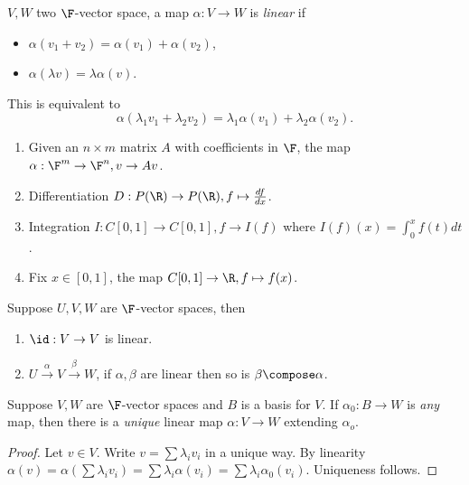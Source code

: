 \documentclass[a4paper]{article}
\theoremstyle{definition}
\begin{document}
\begin{defi}
  \(V, W\) two \(\F\)-vector space, a map \(\alpha: V\to W\) is \emph{linear} if
  \begin{itemize}
  \item \(\alpha(v_1 + v_2) = \alpha(v_1) + \alpha(v_2)\),
  \item \(\alpha(\lambda v) = \lambda \alpha(v)\).
  \end{itemize}
  This is equivalent to
  \[
\alpha(\lambda_1v_1+ \lambda_2v_2) = \lambda_1\alpha(v_1) + \lambda_2\alpha(v_2).
  \]
\end{defi}

\begin{eg}\leavevmode
  \begin{enumerate}
  \item Given an \(n\times m\) matrix \(A\) with coefficients in \(\F\), the map \(\alpha: \F^m\to \F^n, v\to Av\).
  \item Differentiation \(D: P(\R) \to P(\R), f\mapsto \frac{df}{dx}\).
  \item Integration \(I: C[0,1] \to C[0,1], f\to I(f)\) where \(I(f)(x) = \int_0^x f(t)dt\).
  \item Fix \(x\in [0,1]\), the map \(C[0,1]\to \R, f\mapsto f(x)\).
  \end{enumerate}
\end{eg}

\begin{note}
  Suppose \(U, V, W\) are \(\F\)-vector spaces, then
  \begin{enumerate}
  \item \(\id: V\to V\) is linear.
  \item \(U \stackrel{\alpha}{\to} V \stackrel{\beta}{\to} W\), if \(\alpha, \beta\) are linear then so is \(\beta \compose \alpha\).
  \end{enumerate}
\end{note}

\begin{lem}
  Suppose \(V, W\) are \(\F\)-vector spaces and \(B\) is a basis for \(V\). If \(\alpha_0: B\to W\) is \emph{any} map, then there is a \emph{unique} linear map \(\alpha: V\to W\) extending \(\alpha_o\).
\end{lem}

\begin{proof}
  Let \(v\in V\). Write \(v = \sum \lambda_iv_i\) in a unique way. By linearity \(\alpha(v) = \alpha(\sum \lambda_iv_i) = \sum \lambda_i \alpha(v_i) = \sum \lambda_i \alpha_0(v_i)\). Uniqueness follows.
\end{proof}
\end{document}
